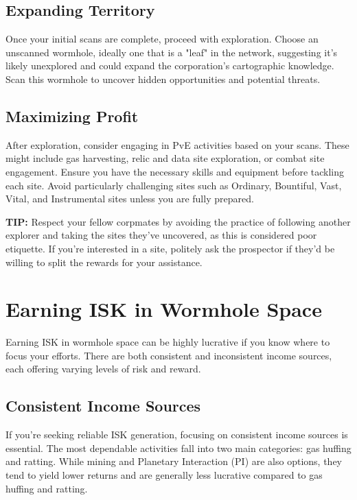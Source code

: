 \documentclass[a4paper,12pt]{report}
\begin{document}
\section{Expanding Territory}

Once your initial scans are complete, proceed with exploration. Choose an unscanned wormhole, ideally one that is a "leaf" in the network, suggesting it’s likely unexplored and could expand the corporation’s cartographic knowledge. Scan this wormhole to uncover hidden opportunities and potential threats.

\section{Maximizing Profit}

After exploration, consider engaging in PvE activities based on your scans. These might include gas harvesting, relic and data site exploration, or combat site engagement. Ensure you have the necessary skills and equipment before tackling each site. Avoid particularly challenging sites such as Ordinary, Bountiful, Vast, Vital, and Instrumental sites unless you are fully prepared.

\textsf{\textbf{TIP:}} \textsf{Respect your fellow corpmates by avoiding the practice of following another explorer and taking the sites they’ve uncovered, as this is considered poor etiquette. If you’re interested in a site, politely ask the prospector if they’d be willing to split the rewards for your assistance.}

\chapter{Earning ISK in Wormhole Space}

Earning ISK in wormhole space can be highly lucrative if you know where to focus your efforts. There are both consistent and inconsistent income sources, each offering varying levels of risk and reward.

\section{Consistent Income Sources}

If you’re seeking reliable ISK generation, focusing on consistent income sources is essential. The most dependable activities fall into two main categories: gas huffing and ratting. While mining and Planetary Interaction (PI) are also options, they tend to yield lower returns and are generally less lucrative compared to gas huffing and ratting.
\end{document}
